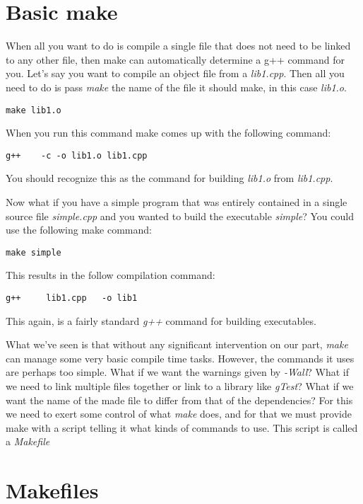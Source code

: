 \documentclass[]{tufte-handout}
\begin{document}
\section{Basic make}

When all you want to do is compile a single file that does not need to be linked to any other file, then make can automatically determine a g++ command for you. Let's say you want to compile an object file from a \textit{lib1.cpp}.  Then all you need to do is pass \textit{make} the name of the file it should make, in this case \textit{lib1.o}.  

\begin{verbatim}
make lib1.o
\end{verbatim}

When you run this command make comes up with the following command:
\begin{verbatim}
g++    -c -o lib1.o lib1.cpp
\end{verbatim}
You should recognize this as the command for building \textit{lib1.o} from \textit{lib1.cpp}. 

Now what if you have a simple program that was entirely contained in a single source file \textit{simple.cpp} and you wanted to build the executable \textit{simple}?  You could use the following make command:
\begin{verbatim}
make simple
\end{verbatim}
This results in the follow compilation command:
\begin{verbatim}
g++     lib1.cpp   -o lib1
\end{verbatim}
This again, is a fairly standard \textit{g++} command for building executables.  

What we've seen is that without any significant intervention on our part, \textit{make} can manage some very basic compile time tasks. However, the commands it uses are perhaps too simple. What if we want the warnings given by \textit{-Wall}? What if we need to link multiple files together or link to a library like \textit{gTest}?  What if we want the name of the made file to differ from that of the dependencies?  For this we need to exert some control of what \textit{make} does, and for that we must provide make with a script telling it what kinds of commands to use.  This script is called a \textit{Makefile}

\section{Makefiles}
\end{document}
